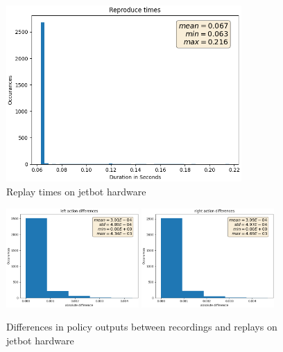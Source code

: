 \begin{figure}
    \centering
    \includegraphics[width=0.8\textwidth]{Bilder/notebook_images/replay_times.png}
    \caption{Replay times on jetbot hardware}
    \label{fig:result_replay_times}
\end{figure} %


\begin{figure}
    \centering
    \includegraphics[width=0.45\textwidth]{Bilder/notebook_images/replay_outputs_action_left.png}
    \includegraphics[width=0.45\textwidth]{Bilder/notebook_images/replay_outputs_action_right.png}
    \caption{Differences in policy outputs between recordings and replays on jetbot hardware}
    \label{fig:result_replay_outputs}
\end{figure} %



